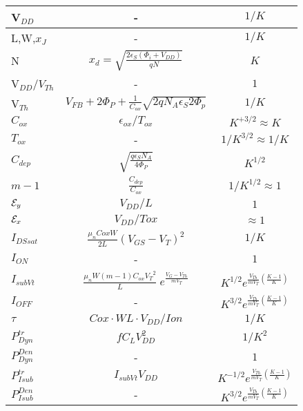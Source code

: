 \documentclass[a4paper, 12pt, twoside, openright]{report}
\begin{document}
  \begin{table}[H]
  {
  \begin{center}
   {
     \begin{tabular}{||l||c|c||}\hline
      V$_{DD}$ & -& $ {1/K}$\\
      \hline
      L,W,$x_J$       &- & $ {1/K}$\\
      \hline
      N & $x_d=\sqrt{\frac{2\epsilon_S(\Phi_i+V_{DD})}{qN}}$&$ {K}$ \\
      \hline
      V$_{DD}/V_{Th}$ &- & ${1}$\\
      \hline
      V$_{Th}$ & $V_{FB}+2\Phi_P+\frac{1}{C_{ox}}\sqrt{2qN_A\epsilon_S 2\Phi_p}$  & $ {1/K}$\\
      \hline
       $C_{ox}$&  $\epsilon_{ox}/T_{ox}$ &$ {K}^{+3/2}\approx K $\\ 
      \hline
      $T_{ox}$       &- & $ {1/{K}^{3/2}}\approx 1/K$\\
      \hline
       $C_{dep}$&   $\sqrt{\frac{q\epsilon_SN_A}{4\Phi_P}}$ &$K^{1/2}$\\
      \hline
       $ m-1 $&  $ \frac{C_{dep}}{C_{ox}}$ &$ {1/K^{1/2}} \approx 1 $\\ 
      \hline
      ${\cal E}_y$ & $V_{DD}/L$ & $ {1}$\\
      \hline
      ${\cal E}_x$ & $V_{DD}/Tox$ & $ {\approx 1}$\\
      \hline
       $I_{DSsat}$      &$\frac{\mu_n Cox W}{2L}(V_{GS}-V_T)^2$ &$ {1/K}$\\ 
      \hline  
       $I_{ON}$      &- &$ {1}$\\ 
      \hline
       $I_{subVt}$      &$\frac{\mu_n W \left(m-1 \right) C_{ox} {V_T}^2}{L}\;
            e^{\displaystyle \frac{ {V_G-V_{Th}}}{ mV_T}}$ &$ K^{1/2} e^{\frac{V_{Th}}{mV_T}
               \left( \frac{K-1}{K}\right)}$\\ 
      \hline  
       $I_{OFF}$      &- & $ K^{3/2} e^{\frac{V_{Th}}{mV_T}
               \left( \frac{K-1}{K}\right)} $\\ 
      \hline
       $\tau$     &$Cox\cdot WL\cdot V_{DD}/Ion$ &$ {1/K}$\\ 
      \hline 
       $P_{Dyn}^{tr}$      &$fC_LV_{DD}^2$  &$ {1/K^{2}}$\\ 
      \hline 
       $P_{Dyn}^{Den}$      &-&$ {1}$\\ 
      \hline
       $P_{Isub}^{tr}$     &$I_{subVt}V_{DD}$  &$ K^{-1/2} e^{\frac{V_{Th}}{mV_T}
               \left( \frac{K-1}{K}\right)} $\\ 
      \hline 
       $P_{Isub}^{Den}$      &-&$ K^{3/2} e^{\frac{V_{Th}}{mV_T}
               \left( \frac{K-1}{K}\right)} $\\ 
      \hline
     \end{tabular}
  }
    \end{center}
}
    \end{table}
\end{document}
